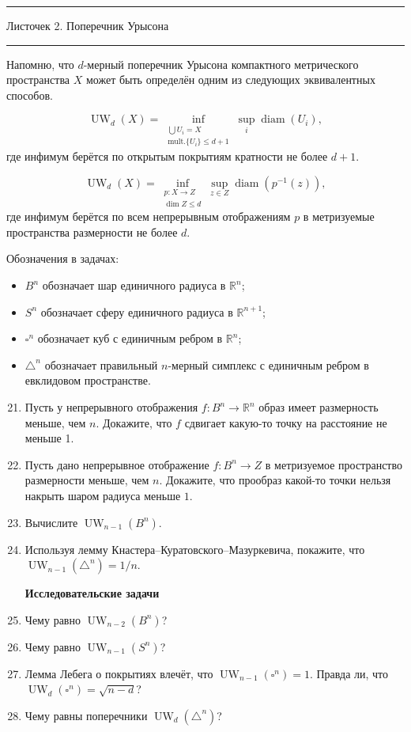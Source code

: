 \documentclass[12pt]{article}
\newcommand{\HRule}{\rule{\linewidth}{0.5mm}}
\renewcommand{\le}{\leqslant}
\DeclareMathOperator{\UW}{UW}
\DeclareMathOperator{\diam}{diam}
\begin{document}
{
\HRule
 \normalfont \Large \center
   Листочек 2. Поперечник Урысона

\HRule
}
Напомню, что $d$-мерный поперечник Урысона компактного метрического пространства $X$ может быть определён одним из следующих эквивалентных способов.

\[
\UW_d(X) = \inf\limits_{\substack{\bigcup U_i = X \\ \text{mult.} \{U_i\} \le d+1}} \sup\limits_{i} \diam(U_i),
\]
где инфимум берётся по открытым покрытиям кратности не более $d+1$.

\[
\UW_d(X) = \inf\limits_{\substack{p: X \to Z \\ \dim Z \le d}} \sup\limits_{z \in Z} \diam(p^{-1}(z)),
\]
где инфимум берётся по всем непрерывным отображениям $p$ в метризуемые пространства размерности не более $d$.

Обозначения в задачах:
\begin{itemize}
  \item $B^n$ обозначает шар единичного радиуса в $\mathbb{R}^n$;
  \item $S^n$ обозначает сферу единичного радиуса в $\mathbb{R}^{n+1}$;
  \item $\square^n$ обозначает куб с единичным ребром в $\mathbb{R}^n$;
  \item $\triangle^n$ обозначает правильный $n$-мерный симплекс с единичным ребром в евклидовом пространстве.
\end{itemize}

\begin{enumerate}
\setcounter{enumi}{20}

\item Пусть у непрерывного отображения $f: B^n \to \mathbb{R}^n$ образ имеет размерность меньше, чем $n$. Докажите, что $f$ сдвигает какую-то точку на расстояние не меньше 1.

\item Пусть дано непрерывное отображение $f: B^n \to Z$ в метризуемое пространство размерности меньше, чем $n$. Докажите, что прообраз какой-то точки нельзя накрыть шаром радиуса меньше $1$.

\item Вычислите $\UW_{n-1}(B^n)$.

\item Используя лемму Кнастера--Куратовского--Мазуркевича, покажите, что $\UW_{n-1}(\triangle^n) = 1/n$.

\begin{center}
  \textbf{Исследовательские задачи}
\end{center}

\item Чему равно $\UW_{n-2}(B^n)$?

\item Чему равно $\UW_{n-1}(S^n)$?

\item Лемма Лебега о покрытиях влечёт, что $\UW_{n-1}(\square^n) = 1$. Правда ли, что $\UW_{d}(\square^n) = \sqrt{n-d}$?

\item Чему равны поперечники $\UW_{d}(\triangle^n)$?


\end{enumerate}
\end{document}
